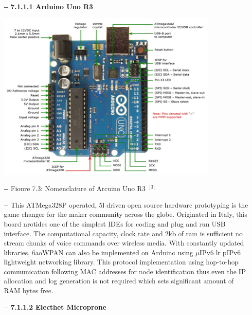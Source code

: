 \documentclass[12pt]{article}
\makeatletter
\newenvironment{indentation}[3]%
	{\par\setlength{\parindent}{#3}
	\setlength{\leftmargin}{#1}       \setlength{\rightmargin}{#2}%
	\advance\linewidth -\leftmargin       \advance\linewidth -\rightmargin%
	\advance\@totalleftmargin\leftmargin  \@setpar{{\@@par}}%
	\parshape 1\@totalleftmargin \linewidth\ignorespaces}{\par}%
\makeatother
\begin{document}
\begin{indentation}{0pt}{0pt}{0pt}
\textbf{7.1.1.1 Arduino Uno R3}
\end{indentation}
\includegraphics[width=314pt]{img-19.png}\textbf{{\large  }}
\begin{center}
\begin{indentation}{18pt}{0pt}{0pt}
Fioure 7.3: Nomenclature of Arcuino Uno R3
$^{[3]}$

\end{indentation}
\end{center}

\begin{indentation}{0pt}{0pt}{0pt}
This ATMega328P operated, 5l driven open source hardware prototyping is
the game changer for the maker community across the globe. Originated in Italy,
this board nrotides one of the simplest IDEs for coding and plug and run USB
interface. The computational capacity, clock rate and 2kb of ram is sufficient no
stream chunks of voice commands over wireless media. With constantly updated
libraries, 6aoWPAN can also be implemented on Arduino using $\mu{}$IPv6 lr pIPv6
lightweight networking library. This protocol implementation using hop-to-hop
communication following MAC addresses for node identification thus even the IP
allocation and log generation is not required which sets significant amount of
RAM bytes free.
\end{indentation}

\begin{indentation}{0pt}{0pt}{0pt}
\textbf{7.1.1.2 Electhet Microprone}
\end{indentation}
\end{document}
